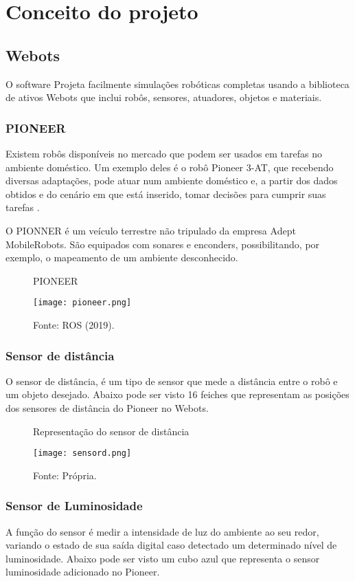 \chapter{Conceito do projeto}
\label{chap:fundteor}
\section{Webots}
O software Projeta facilmente simulações robóticas completas usando a biblioteca de ativos Webots que inclui
robôs, sensores, atuadores, objetos e materiais. \cite{Cyberbotics}
\subsection{PIONEER}
Existem robôs disponíveis no mercado que podem ser usados em tarefas
no ambiente doméstico. Um exemplo deles é o robô Pioneer 3-AT, que
recebendo diversas adaptações, pode atuar num ambiente doméstico e, a partir
dos dados obtidos e do cenário em que está inserido, tomar decisões para
cumprir suas tarefas \cite{OLIVEIRA}.

O PIONNER é um veículo terrestre não tripulado da empresa Adept MobileRobots.
São equipados com sonares e enconders, possibilitando, por exemplo, o mapeamento de um ambiente desconhecido.\cite{Pioneer}
\begin{figure} [h!]	
   \centering
   \caption{PIONEER}
   \texttt{[image: pioneer.png]}
   \caption*{Fonte: ROS (2019).}
   \label{fig:pioneer}
\end{figure}	


\subsection{Sensor de distância} 
O sensor de distância, é um tipo de sensor que mede a distância entre o robô e um objeto desejado.
Abaixo pode ser visto 16 feiches que representam as posições dos sensores de distância do Pioneer no Webots.

\begin{figure} [h!]	
   \centering
   \caption{Representação do sensor de distância}
   \texttt{[image: sensord.png]}
   \caption*{Fonte: Própria.}
   \label{fig:sensordistancia}

\end{figure}	

\subsection{Sensor de Luminosidade} 
A função do sensor é medir a intensidade de luz do ambiente ao seu redor, variando o estado de sua saída digital caso detectado um determinado nível de luminosidade. 
Abaixo pode ser visto um cubo azul que representa o sensor luminosidade adicionado no Pioneer.

